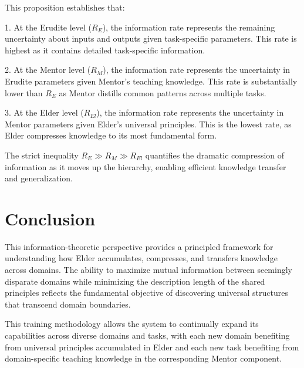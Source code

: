 This proposition establishes that:

1. At the Erudite level ($R_E$), the information rate represents the remaining uncertainty about inputs and outputs given task-specific parameters. This rate is highest as it contains detailed task-specific information.

2. At the Mentor level ($R_M$), the information rate represents the uncertainty in Erudite parameters given Mentor's teaching knowledge. This rate is substantially lower than $R_E$ as Mentor distills common patterns across multiple tasks.

3. At the Elder level ($R_{El}$), the information rate represents the uncertainty in Mentor parameters given Elder's universal principles. This is the lowest rate, as Elder compresses knowledge to its most fundamental form.

The strict inequality $R_E \gg R_M \gg R_{El}$ quantifies the dramatic compression of information as it moves up the hierarchy, enabling efficient knowledge transfer and generalization.

\section{Conclusion}

This information-theoretic perspective provides a principled framework for understanding how Elder accumulates, compresses, and transfers knowledge across domains. The ability to maximize mutual information between seemingly disparate domains while minimizing the description length of the shared principles reflects the fundamental objective of discovering universal structures that transcend domain boundaries.

This training methodology allows the system to continually expand its capabilities across diverse domains and tasks, with each new domain benefiting from universal principles accumulated in Elder and each new task benefiting from domain-specific teaching knowledge in the corresponding Mentor component.